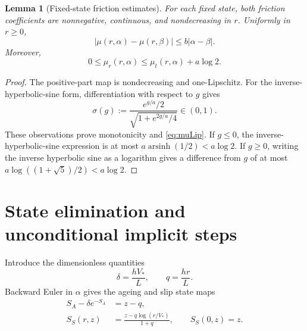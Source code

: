 \documentclass[11pt,a4paper]{article}
\newtheorem{lemma}[theorem]{Lemma}
\theoremstyle{definition}\newtheorem{definition}[theorem]{Definition}
\theoremstyle{remark}\newtheorem{remark}[theorem]{Remark}
\newcommand{\asinh}{\operatorname{arsinh}}
\numberwithin{equation}{section}
\begin{document}
\begin{lemma}[Fixed-state friction estimates]\label{lem:friction}
For each fixed state, both friction coefficients are nonnegative, continuous, and nondecreasing in $r$. Uniformly in $r\ge0$,
\begin{equation}\label{eq:muLip}
 |\mu(r,\alpha)-\mu(r,\beta)|\le b|\alpha-\beta|.
\end{equation}
Moreover,
\begin{equation}\label{eq:asinhbounds}
 0\le\mu_r(r,\alpha)\le\mu_t(r,\alpha)+a\log2.
\end{equation}
\end{lemma}
\begin{proof}
The positive-part map is nondecreasing and one-Lipschitz. For the inverse-hyperbolic-sine form, differentiation with respect to $g$ gives
\[
 \sigma(g):=\frac{e^{g/a}/2}{\sqrt{1+e^{2g/a}/4}}\in(0,1).
\]
These observations prove monotonicity and \eqref{eq:muLip}. If $g\le0$, the inverse-hyperbolic-sine expression is at most $a\asinh(1/2)<a\log2$. If $g\ge0$, writing the inverse hyperbolic sine as a logarithm gives a difference from $g$ of at most $a\log((1+\sqrt5)/2)<a\log2$.
\end{proof}

\section{State elimination and unconditional implicit steps}\label{sec:existence}
Introduce the dimensionless quantities
\begin{equation}\label{eq:qdelta}
 \delta=\frac{hV_*}{L},\qquad q=\frac{hr}{L}.
\end{equation}
Backward Euler in $\alpha$ gives the ageing and slip state maps
\begin{align}
 S_A-\delta e^{-S_A}&=z-q,\label{eq:SA}\\
 S_S(r,z)&=\frac{z-q\log(r/V_*)}{1+q},\qquad S_S(0,z)=z.\label{eq:SS}
\end{align}
\end{document}

